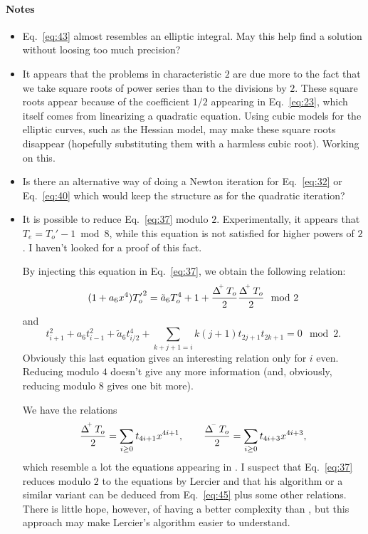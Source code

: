 \documentclass{article}
\DeclareMathOperator{\Dplus}{\Delta^{{}^{\kern-0.5ex +}}}
\DeclareMathOperator{\Dminus}{\Delta^{{}^{\kern-0.5ex -}}}
\begin{document}
\paragraph{Notes}
\begin{itemize}
\item Eq.~\eqref{eq:43} almost resembles an elliptic integral. May
  this help find a solution without loosing too much precision?
\item It appears that the problems in characteristic $2$ are due more
  to the fact that we take square roots of power series than to the
  divisions by $2$. These square roots appear because of the
  coefficient $1/2$ appearing in Eq.~\eqref{eq:23}, which itself comes
  from linearizing a quadratic equation. Using cubic models for the
  elliptic curves, such as the Hessian model, may make these square
  roots disappear (hopefully substituting them with a harmless cubic
  root). Working on this.
\item Is there an alternative way of doing a Newton iteration for
  Eq.~\eqref{eq:32} or Eq.~\eqref{eq:40} which would keep the
  structure as for the quadratic iteration?
\item It is possible to reduce Eq.~\eqref{eq:37} modulo
  $2$. Experimentally, it appears that $T_e = T_o' - 1 \bmod 8$, while
  this equation is not satisfied for higher powers of $2$. I haven't
  looked for a proof of this fact.

  By injecting this equation in Eq.~\eqref{eq:37}, we obtain the
  following relation:
  \begin{equation}
    \label{eq:44}
    (1 + a_6x^4){T_o'}^2 = \tilde{a}_6T_o^4 + 1 + \frac{\Dplus T_o}{2}\frac{\Dplus T_o}{2} \mod 2
  \end{equation}
  and
  \begin{equation}
    \label{eq:45}
    t_{i+1}^2 + a_6t_{i-1}^2 + \tilde{a}_6t_{i/2}^4 + \sum_{k+j+1=i}k(j+1)t_{2j+1}t_{2k+1} = 0 \mod 2.
  \end{equation}
  Obviously this last equation gives an interesting relation only for
  $i$ even.  Reducing modulo $4$ doesn't give any more information
  (and, obviously, reducing modulo $8$ gives one bit more).

  We have the relations
  \begin{equation}
    \label{eq:46}
    \frac{\Dplus T_o}{2} = \sum_{i\ge0}t_{4i+1}x^{4i+1},\qquad
    \frac{\Dminus T_o}{2} = \sum_{i\ge0}t_{4i+3}x^{4i+3},
  \end{equation}
  which resemble a lot the equations appearing in \cite{lercier96}. I
  suspect that Eq.~\eqref{eq:37} reduces modulo $2$ to the equations
  by Lercier and that his algorithm or a similar variant can be
  deduced from Eq.~\eqref{eq:45} plus some other relations. There is
  little hope, however, of having a better complexity than
  \cite{lercier96}, but this approach may make Lercier's algorithm
  easier to understand.
\end{itemize}





\end{document}
